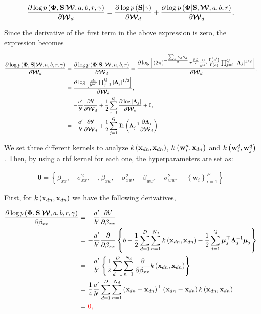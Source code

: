 	\begin{align}
	\frac{\partial \log p\left(\boldsymbol{\Phi},\mathbf{S}|\boldsymbol{\mathcal{W}},a,b,r,\gamma\right)}{\partial\boldsymbol{\mathcal{W}}_d} =
	\frac{\partial \log p\left(\mathbf{S}|\gamma\right)}{\partial\boldsymbol{\mathcal{W}}_d} + \frac{\partial \log p\left(\boldsymbol{\Phi}|\mathbf{S},\boldsymbol{\mathcal{W}},a,b,r\right)}{\partial\boldsymbol{\mathcal{W}}_d},
	\end{align}
	
	Since the derivative of the first term in the above expression is zero, the expression becomes
	
	\begin{align}
	\frac{\partial \log p\left(\boldsymbol{\Phi},\mathbf{S}|\boldsymbol{\mathcal{W}},a,b,r,\gamma\right)}{\partial\boldsymbol{\mathcal{W}}_d} &=
	\frac{\partial \log p\left(\boldsymbol{\Phi}|\mathbf{S},\boldsymbol{\mathcal{W}},a,b,r\right)}{\partial\boldsymbol{\mathcal{W}}_d} = \frac{\partial \log \Big[\left(2\pi\right)^{-\frac{\sum_d L_d N_d}{2}}r^{\frac{PQ}{2}}\frac{b^{a}}{b'^{a'}}\frac{\Gamma\left(a'\right)}{\Gamma\left(a\right)}\prod_{j=1}^{Q}|\boldsymbol{\Lambda}_j|^{1/2}\Big]}{\partial\boldsymbol{\mathcal{W}}_d},\notag\\
	&= \frac{\partial \log \Big[\frac{cte}{b'^{a'}} \prod_{j=1}^{Q}|\boldsymbol{\Lambda}_j|^{1/2}\Big]}{\partial\boldsymbol{\mathcal{W}}_d}\notag,\\
	& = -\frac{a'}{b'}\frac{\partial b'}{\partial\boldsymbol{\mathcal{W}}_d}+\frac{1}{2}\sum_{j=1}^{Q}\frac{\partial \log |\boldsymbol{\Lambda}_j|}{\partial\boldsymbol{\mathcal{W}}_d}+0 , \notag \\
	& =  -\frac{a'}{b'}\frac{\partial b'}{\partial\boldsymbol{\mathcal{W}}_d}+\frac{1}{2}\sum_{j=1}^{Q} \operatorname{Tr}\left(\boldsymbol{\Lambda}_j^{-1}\frac{\partial \boldsymbol{\Lambda}_j}{\partial\boldsymbol{\mathcal{W}}_d}\right)
	\label{eq:derivativeW2}
	\end{align}
	
	
	We set three different kernels to analyze $k\left(\mathbf{x}_{dn},\mathbf{x}_{dn}\right)$, $k\left(\mathbf{w}_{i}^d,\mathbf{x}_{dn}\right)$ and $k\left(\mathbf{w}_{i}^d,\mathbf{w}_{j}^d\right)$. Then, by using a rbf kernel for each one, the hyperparameters are set as:
	
	\begin{align}
	\boldsymbol{\theta} = \left\{\beta_{xx},\quad \sigma^2_{xx}, \quad,\beta_{xw},\quad \sigma^2_{xw}, \quad \beta_{ww},\quad \sigma^2_{ww}, \quad \left\{\mathbf{w}_i\right\}_{i=1}^{P}\right\}
	\end{align}
	
	First, for $k\left(\mathbf{x}_{dn},\mathbf{x}_{dn}\right)$  we have the following derivatives,
	
	
	\begin{align}
	\frac{\partial \log p\left(\boldsymbol{\Phi},\mathbf{S}|\boldsymbol{\mathcal{W}},a,b,r,\gamma\right)}{\partial \beta_{xx}} &= -\frac{a'}{b'}\frac{\partial b'}{\partial \beta_{xx}} \\
	& =  -\frac{a'}{b'}\frac{\partial }{\partial \beta_{xx}}\left\{b+{\frac{1}{2}}\sum\limits_{d=1}^{D}\sum\limits_{n=1}^{N_d}k\left(\mathbf{x}_{dn},\mathbf{x}_{dn}\right)-{\frac{1}{2}}\sum\limits_{j=1}^{Q}\boldsymbol{\mu}_j^\top \boldsymbol{\Lambda}_j^{-1}\boldsymbol{\mu}_j\right\} \\
	& = -\frac{a'}{b'}\left\{\frac{1}{2}\sum\limits_{d=1}^{D}\sum\limits_{n=1}^{N_d}\frac{\partial }{\partial \beta_{xx}}k\left(\mathbf{x}_{dn},\mathbf{x}_{dn}\right)\right\} \\
	& = \frac{1}{4}\frac{a'}{b'}\sum\limits_{d=1}^{D}{\sum\limits_{n=1}^{N_d} {\left(\mathbf{x}_{dn} - \mathbf{x}_{dn}\right)^\top\left(\mathbf{x}_{dn} - \mathbf{x}_{dn}\right)k\left(\mathbf{x}_{dn},\mathbf{x}_{dn}\right)}}\\
	& = \color{red}{0},
	\end{align}
	
